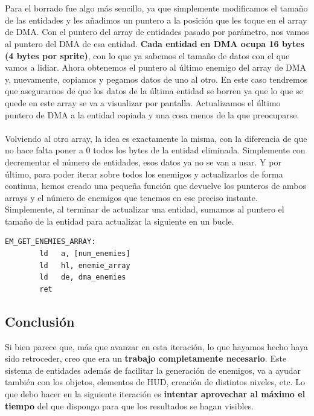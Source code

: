 \\ \\
Para el borrado fue algo más sencillo, ya que simplemente modificamos el tamaño de las entidades y les añadimos un puntero a la posición que les toque en el array de DMA. Con el puntero del array de entidades pasado por parámetro, nos vamos al puntero del DMA de esa entidad. \textbf{Cada entidad en DMA ocupa 16 bytes (4 bytes por sprite)}, con lo que ya sabemos el tamaño de datos con el que vamos a lidiar. Ahora obtenemos el puntero al último enemigo del array de DMA y, nuevamente, copiamos y pegamos datos de uno al otro. En este caso tendremos que asegurarnos de que los datos de la última entidad se borren ya que lo que se quede en este array se va a visualizar por pantalla. Actualizamos el último puntero de DMA a la entidad copiada y una cosa menos de la que preocuparse.
\\ \\
Volviendo al otro array, la idea es exactamente la misma, con la diferencia de que no hace falta poner a 0 todos los bytes de la entidad eliminada. Simplemente con decrementar el número de entidades, esos datos ya no se van a usar.
\clearpage
Y por último, para poder iterar sobre todos los enemigos y actualizarlos de forma continua, hemos creado una pequeña función que devuelve los punteros de ambos arrays y el número de enemigos que tenemos en ese preciso instante. Simplemente, al terminar de actualizar una entidad, sumamos al puntero el tamaño de la entidad para actualizar la siguiente en un bucle.

\begin{lstlisting}[caption={Get Enemies Array}, label={code:enearray}]
    EM_GET_ENEMIES_ARRAY:
        ld 	 a, [num_enemies]
        ld 	 hl, enemie_array
        ld   de, dma_enemies
        ret

\end{lstlisting}

\subsection{Conclusión}

Si bien parece que, más que avanzar en esta iteración, lo que hayamos hecho haya sido retroceder, creo que era un \textbf{trabajo completamente necesario}. Este sistema de entidades además de facilitar la generación de enemigos, va a ayudar también con los objetos, elementos de HUD, creación de distintos niveles, etc. Lo que debo hacer en la siguiente iteración es \textbf{intentar aprovechar al máximo el tiempo} del que dispongo para que los resultados se hagan visibles.

